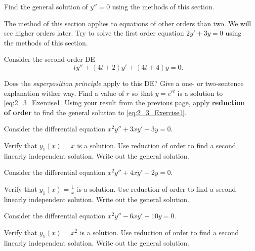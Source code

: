 \begin{exercise}
Find the general solution of $y'' = 0$ using the methods of this section.
\end{exercise}

\begin{exercise}
The method of this section applies to equations of other orders than two.
We will see
higher orders later.  Try to solve the first order equation
$2y' + 3y = 0$ using the methods of this section.
\end{exercise}

\begin{exercise}
Consider the second-order DE 
\begin{equation}
ty''+(4t+2)y'+(4t+4)y=0. \label{eq:2_3_Exercise1}
\end{equation}
\begin{tasks}
\task Does the {\it superposition principle} apply to this DE? Give a one- or two-sentence explanation wither way.
\task Find a value of $r$ so that $y=e^{rt}$ is a solution to \eqref{eq:2_3_Exercise1}
\task Using your result from the previous page, apply {\bf reduction of order} to find the general solution to \eqref{eq:2_3_Exercise1}.
\end{tasks}
\end{exercise}

\begin{exercise}\ansMark%
Consider the differential equation $x^2y'' + 3xy' - 3y = 0$.
\begin{tasks}
\task Verify that $y_1(x) = x$ is a solution.
\task Use reduction of order to find a second linearly independent solution.
\task Write out the general solution. 
\end{tasks}
\end{exercise}

\begin{exercise}\ansMark%
Consider the differential equation $x^2y'' + 4xy' - 2y = 0$.
\begin{tasks}
\task Verify that $y_1(x) = \frac{1}{x}$ is a solution.
\task Use reduction of order to find a second linearly independent solution.
\task Write out the general solution. 
\end{tasks}
\end{exercise}

\begin{exercise}\ansMark%
Consider the differential equation $x^2y'' -6xy' - 10y = 0$.
\begin{tasks}
\task Verify that $y_1(x) = x^2$ is a solution.
\task Use reduction of order to find a second linearly independent solution.
\task Write out the general solution. 
\end{tasks}
\end{exercise}

